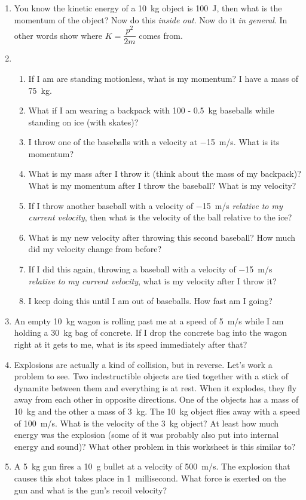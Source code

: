 \begin{enumerate}
\item You know the kinetic energy of a \SI{10}{kg} object is \SI{100}{\joule}, then what is the momentum of the object? Now do this \emph{inside out}. Now do it \emph{in general}. In other words show where $K=\dfrac{p^2}{2m}$ comes from.

\item
\begin{enumerate}
	\item If I am are standing motionless, what is my momentum? I have a mass of \SI{75}{kg}.\bigskip
	\item What if I am wearing a backpack with 100 - \SI{0.5}{kg} baseballs while standing on ice (with skates)?\bigskip
	\item I throw one of the baseballs with a velocity at \SI{-15}{m/s}. What is its momentum?\bigskip
	\item What is my mass after I throw it (think about the mass of my backpack)? What is my momentum after I throw the baseball? What is my velocity?\bigskip
	\item If I throw another baseball with a velocity of \SI{-15}{m/s} \emph{relative to my current velocity}, then what is the velocity of the ball relative to the ice?\bigskip
	\item What is my new velocity after throwing this second baseball? How much did my velocity change from before?\bigskip
	\item If I did this again, throwing a baseball with a velocity of \SI{-15}{m/s} \emph{relative to my current velocity}, what is my velocity after I throw it?\bigskip
	\item I keep doing this until I am out of baseballs. How fast am I going?\hugeskip
\end{enumerate}

\item An empty \SI{10}{kg} wagon is rolling past me at a speed of \SI{5}{m/s} while I am holding a \SI{30}{kg} bag of concrete. If I drop the concrete bag into the wagon right at it gets to me, what is its speed immediately after that?\bigskip



\item Explosions are actually a kind of collision, but in reverse. Let's work a problem to see. Two indestructible objects are tied together with a stick of dynamite between them and everything is at rest. When it explodes, they fly away from each other in opposite directions. One of the objects has a mass of \SI{10}{kg} and the other a mass of \SI{3}{kg}. The \SI{10}{kg} object flies away with a speed of \SI{100}{m/s}. What is the velocity of the \SI{3}{kg} object? At least how much energy was the explosion (some of it was probably also put into internal energy and sound)? What other problem in this worksheet is this similar to?
\bigskip
\item A \SI{5}{kg} gun fires a \SI{10}{\gram} bullet at a velocity of \SI{500}{m/s}. The explosion that causes this shot takes place in \SI{1}{millisecond}. What force is exerted on the gun and what is the gun's recoil velocity?\bigskip


\end{enumerate}
